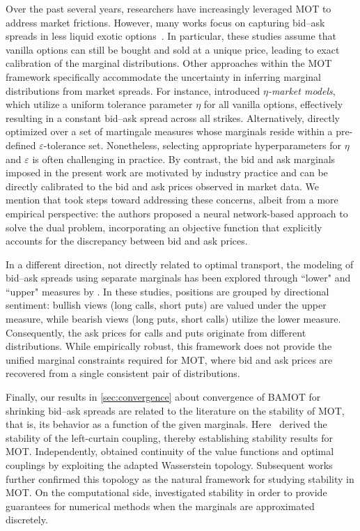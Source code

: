 \documentclass[11pt]{article}
\theoremstyle{plain}
\theoremstyle{definition}
\theoremstyle{remark}
\theoremstyle{plain}
\begin{document}
Over the past several years, researchers have increasingly leveraged MOT to address market frictions. However, many works focus on capturing bid--ask spreads in less liquid exotic options~\cite{FahimHuangJui, HenryLabordere2013}. In particular, these studies assume that vanilla options can still be bought and sold at a unique price, leading to exact calibration of the marginal distributions. Other approaches within the MOT framework specifically accommodate the uncertainty in inferring marginal distributions from market spreads. For instance, \cite{HouObloj2018} introduced \textit{$\eta$-market models}, which utilize a uniform tolerance parameter $\eta$ for all vanilla options, effectively resulting in a constant bid--ask spread across all strikes. Alternatively, \cite{zhou2021} directly optimized over a set of martingale measures whose marginals reside within a pre-defined $\varepsilon$-tolerance set. Nonetheless, selecting appropriate hyperparameters for $\eta$ and $\varepsilon$ is often challenging in practice. By contrast, the bid and ask marginals imposed in the present work are motivated by industry practice and can be directly calibrated to the bid and ask prices observed in market data. We mention that \cite{Neufeld2022} took steps toward addressing these concerns, albeit from a more empirical perspective: the authors proposed a neural network-based approach to solve the dual problem, incorporating an objective function that explicitly accounts for the discrepancy between bid and ask prices. 

%

In a different direction, not directly related to optimal transport, the modeling of bid--ask spreads using separate marginals has been explored through ``lower" and ``upper" measures by \cite{MadanSchoutens, madan2023modeling}. In these studies, positions are grouped by directional sentiment: bullish views (long calls, short puts) are valued under the upper measure, while bearish views (long puts, short calls) utilize the lower measure. Consequently, the ask prices for calls and puts originate from different distributions. While empirically robust, this framework does not provide the unified marginal constraints required for MOT, where bid and ask prices are recovered from a single consistent pair of distributions.


%

Finally, our results in \cref{sec:convergence} about convergence of BAMOT for shrinking bid--ask spreads are related to the literature on the stability of MOT, that is, its behavior as a function of the given marginals. %
%
Here~\cite{Juillet2016} derived the stability of the left-curtain coupling, thereby establishing stability results for MOT. Independently, \cite{Wiesel2023,BeiglbockJourdainMargheritiPammer2023} obtained continuity of the value functions and optimal couplings by exploiting the adapted Wasserstein topology. Subsequent works~\cite{NeufeldSester2021,BeiglbockJourdainMargheritiPammer2022} further confirmed this topology as the natural framework for studying stability in MOT. On the computational side, \cite{GuoObloj} investigated stability in order to provide guarantees for numerical methods when the marginals are approximated discretely. %
\end{document}
